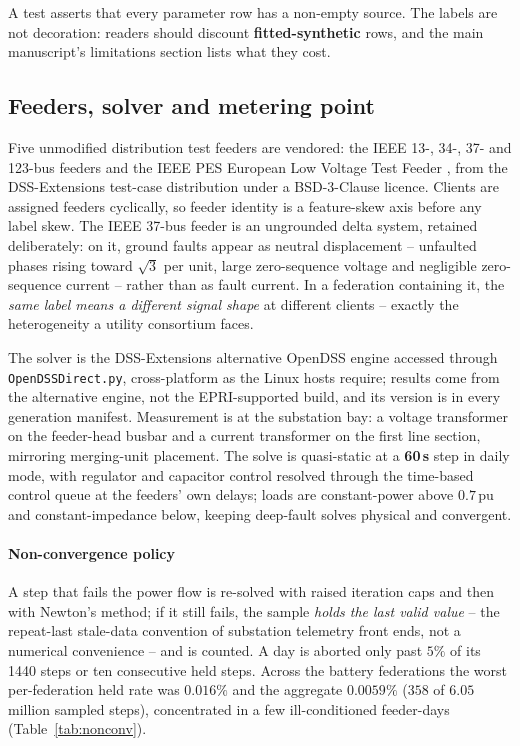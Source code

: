 \documentclass[review,12pt]{elsarticle}
\begin{document}
A test asserts that every parameter row has a non-empty source. The
labels are not decoration: readers should discount
\textbf{fitted-synthetic} rows, and the main manuscript's limitations
section lists what they cost.

\subsection{Feeders, solver and metering point}

Five unmodified distribution test feeders are vendored: the IEEE 13-,
34-, 37- and 123-bus feeders and the IEEE PES European Low Voltage Test
Feeder \cite{kersting2001}, from the DSS-Extensions test-case
distribution under a BSD-3-Clause licence. Clients are assigned feeders
cyclically, so feeder identity is a feature-skew axis before any label
skew. The IEEE 37-bus feeder is an ungrounded delta system, retained
deliberately: on it, ground faults appear as neutral displacement --
unfaulted phases rising toward $\sqrt{3}$ per unit, large zero-sequence
voltage and negligible zero-sequence current -- rather than as fault
current. In a federation containing it, the \emph{same label means a
different signal shape} at different clients -- exactly the heterogeneity
a utility consortium faces.

The solver is the DSS-Extensions alternative OpenDSS engine accessed
through \texttt{OpenDSSDirect.py}, cross-platform as the Linux hosts
require; results come from the alternative engine, not the
EPRI-supported build, and its version is in every generation manifest.
Measurement is at the substation bay: a voltage transformer on the
feeder-head busbar and a current transformer on the first line section,
mirroring merging-unit placement. The solve is quasi-static at a
\textbf{60\,s} step in daily mode, with regulator and capacitor control
resolved through the time-based control queue at the feeders' own
delays; loads are constant-power above $0.7$\,pu and constant-impedance
below, keeping deep-fault solves physical and convergent.

\paragraph{Non-convergence policy}
A step that fails the power flow is re-solved with raised iteration caps
and then with Newton's method; if it still fails, the sample \emph{holds
the last valid value} -- the repeat-last stale-data convention of
substation telemetry front ends, not a numerical convenience -- and is
counted. A day is aborted only past $5\%$ of its 1440 steps or ten
consecutive held steps. Across the battery federations the worst
per-federation held rate was $0.016\%$ and the aggregate $0.0059\%$
($358$ of $6.05$ million sampled steps), concentrated in a few
ill-conditioned feeder-days (Table~\ref{tab:nonconv}).
\end{document}
